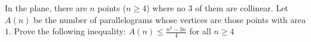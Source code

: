 In the plane, there are $n$ points ($n\ge 4$) where no 3 of them are collinear. Let $A(n)$ be the number of parallelograms whose vertices are those points with area $1$. Prove the following inequality:
$A(n)\leq \frac{n^2-3n}{4}$ for all $n\ge 4$